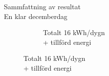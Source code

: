 \begin{frame}{Sammfattning av resultat\\En klar decemberdag}
\begin{figure}
{\begin{subfigure}[b]{0.55\textwidth}
                \caption*{Totalt 16 kWh/dygn \\+ tillförd energi}
        \end{subfigure}
        }
\end{figure}

\end{frame}
